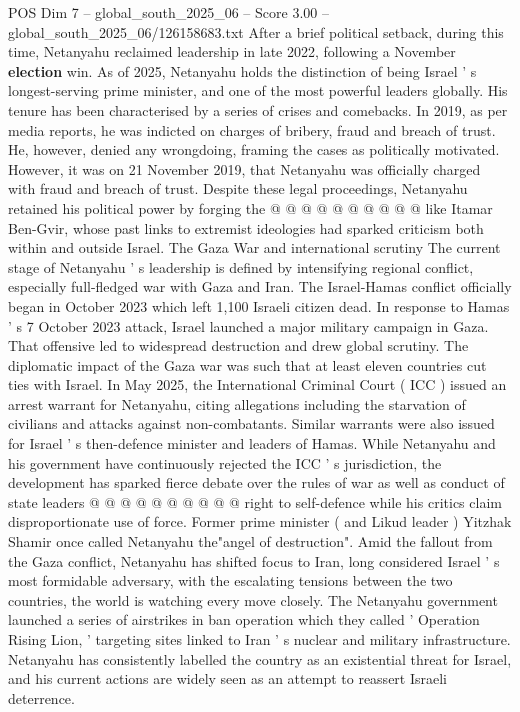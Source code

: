 \begin{textsample}{POS Dim 7 – global\_south\_2025\_06 – Score 3.00 – global\_south\_2025\_06/126158683.txt}
After a brief political setback, during this time, Netanyahu reclaimed leadership in late 2022, following a November \textbf{election} win.
As of 2025, Netanyahu holds the distinction of being Israel ' s longest-serving prime minister, and one of the most powerful leaders globally.
His tenure has been characterised by a series of crises and comebacks.
In 2019, as per media reports, he was indicted on charges of bribery, fraud and breach of trust.
He, however, denied any wrongdoing, framing the cases as politically motivated.
However, it was on 21 November 2019, that Netanyahu was officially charged with fraud and breach of trust.
Despite these legal proceedings, Netanyahu retained his political power by forging the @ @ @ @ @ @ @ @ @ @ like Itamar Ben-Gvir, whose past links to extremist ideologies had sparked criticism both within and outside Israel.
The Gaza War and international scrutiny The current stage of Netanyahu ' s leadership is defined by intensifying regional conflict, especially full-fledged war with Gaza and Iran.
The Israel-Hamas conflict officially began in October 2023 which left 1,100 Israeli citizen dead.
In response to Hamas ' s 7 October 2023 attack, Israel launched a major military campaign in Gaza.
That offensive led to widespread destruction and drew global scrutiny.
The diplomatic impact of the Gaza war was such that at least eleven countries cut ties with Israel.
In May 2025, the International Criminal Court ( ICC ) issued an arrest warrant for Netanyahu, citing allegations including the starvation of civilians and attacks against non-combatants.
Similar warrants were also issued for Israel ' s then-defence minister and leaders of Hamas.
While Netanyahu and his government have continuously rejected the ICC ' s jurisdiction, the development has sparked fierce debate over the rules of war as well as conduct of state leaders @ @ @ @ @ @ @ @ @ @ right to self-defence while his critics claim disproportionate use of force.
Former prime minister ( and Likud leader ) Yitzhak Shamir once called Netanyahu the"angel of destruction".
Amid the fallout from the Gaza conflict, Netanyahu has shifted focus to Iran, long considered Israel ' s most formidable adversary, with the escalating tensions between the two countries, the world is watching every move closely.
The Netanyahu government launched a series of airstrikes in ban operation which they called ' Operation Rising Lion, ' targeting sites linked to Iran ' s nuclear and military infrastructure.
Netanyahu has consistently labelled the country as an existential threat for Israel, and his current actions are widely seen as an attempt to reassert Israeli deterrence.

\end{textsample}
